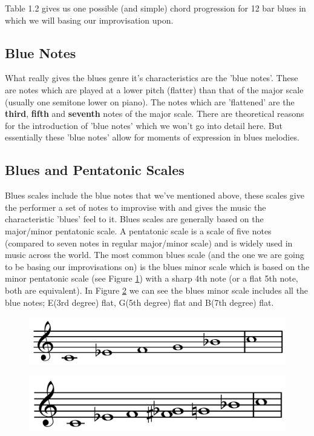 \documentclass[pdftex,12pt,a4paper]{report}
\begin{document}
Table 1.2 gives us one possible (and simple) chord progression for 12 bar blues in which we will basing our improvisation upon. 


\subsection{Blue Notes} What really gives the blues genre it's characteristics are the 'blue notes'. These are notes which are played at a lower pitch (flatter) than that of the major scale (usually one semitone lower on piano). The notes which are 'flattened' are the \textbf{third}, \textbf{fifth} and \textbf{seventh} notes of the major scale.
There are theoretical reasons for the introduction of 'blue notes' which we won't go into detail here. But essentially these 'blue notes' allow for moments of expression in blues melodies. 

\subsection{Blues and Pentatonic Scales}
Blues scales include the blue notes that we've mentioned above, these scales give the performer a set of notes to improvise with and gives the music the characteristic 'blues' feel to it. Blues scales are generally based on the major/minor pentatonic scale. A pentatonic scale is a scale of five notes (compared to seven notes in regular major/minor scale) and is widely used in music across the world. The most common blues scale (and the one we are going to be basing our improvisations on) is the blues minor scale which is based on the minor pentatonic scale (see Figure \ref{fig:cminorpentatonicscale}) with a sharp 4th note (or a flat 5th note, both are equivalent). In Figure \ref{fig:cminorbluesscale} we can see the blues minor scale includes all the blue notes; E(3rd degree) flat, G(5th degree) flat and B(7th degree) flat.

\begin{figure}[here]
  \centering
  \includegraphics[scale=0.3]{figure/minorpentatonicscale.png}
  \label{fig:cminorpentatonicscale}
\end{figure}

\begin{figure}[here]
  \centering
  \includegraphics[scale=0.3]{figure/bluesminorhexatonicscale.png}
  \label{fig:cminorbluesscale}
\end{figure}
\end{document}
